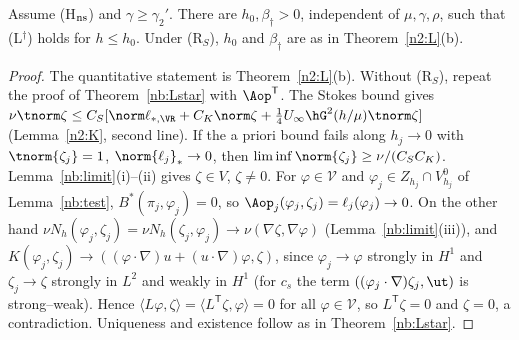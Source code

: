 \begin{theorem}\label{n2:Ldag}
Assume (H$_{\rm ns}$) and $\gamma\ge\gamma_2'$. There are $h_0,\beta_\dagger>0$, independent of $\mu,\gamma,\rho$, such that (L$^\dagger$) holds for $h\le h_0$.
Under (R$_S$), $h_0$ and $\beta_\dagger$ are as in Theorem~\ref{n2:L}(b).
\end{theorem}

\begin{proof}
The quantitative statement is Theorem~\ref{n2:L}(b). Without (R$_S$), repeat the proof of Theorem~\ref{nb:Lstar} with $\Aop^{\mathsf T}$.
The Stokes bound gives $\nu\tnorm\zeta\le C_S[\norm\ell_{\ast,\VR}+C_K\norm\zeta+\frac14U_\infty\hG^2(h/\mu)\tnorm\zeta]$ (Lemma~\ref{n2:K}, second line). If
the a priori bound fails along $h_j\to0$ with $\tnorm{\zeta_j}=1$, $\norm{\ell_j}_\ast\to0$, then $\liminf\norm{\zeta_j}\ge\nu/(C_SC_K)$.
Lemma~\ref{nb:limit}(i)--(ii) gives $\zeta\in V$, $\zeta\ne0$. For $\varphi\in\mathcal V$ and $\varphi_j\in Z_{h_j}\cap V_{h_j}^0$ of Lemma~\ref{nb:test},
$B^\ast(\pi_j,\varphi_j)=0$, so $\Aop_j(\varphi_j,\zeta_j)=\ell_j(\varphi_j)\to0$. On the other hand $\nu N_h(\varphi_j,\zeta_j)=\nu N_h(\zeta_j,\varphi_j)\to\nu(\nabla\zeta,\nabla\varphi)$
(Lemma~\ref{nb:limit}(iii)), and $K(\varphi_j,\zeta_j)\to((\varphi\cdot\nabla)u+(u\cdot\nabla)\varphi,\zeta)$, since $\varphi_j\to\varphi$ strongly in $H^1$ and
$\zeta_j\to\zeta$ strongly in $L^2$ and weakly in $H^1$ (for $c_s$ the term $((\varphi_j\cdot\nabla)\zeta_j,\ut)$ is strong--weak). Hence
$\langle L\varphi,\zeta\rangle=\langle L^{\mathsf T}\zeta,\varphi\rangle=0$ for all $\varphi\in\mathcal V$, so $L^{\mathsf T}\zeta=0$ and $\zeta=0$, a contradiction.
Uniqueness and existence follow as in Theorem~\ref{nb:Lstar}.
\end{proof}

